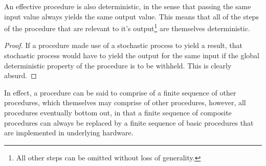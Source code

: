 An effective procedure is also deterministic, in the sense that passing the
same input value always yields the same output value. This means that all of
the steps of the procedure that are relevant to it's output\footnote{All other
steps can be omitted without loss of generality.} are themselves deterministic.

\begin{proof} If a procedure made use of a stochastic process to yield a
result, that stochastic process would have to yield the output for the same
input if the global deterministic property of the procedure is to be withheld.
This is clearly absurd.\end{proof}

In effect, a procedure can be said to comprise of a finite sequence of other
procedures, which themselves may comprise of other procedures, however, all
procedures eventually bottom out, in that a finite sequence of composite
procedures can always be replaced by a finite sequence of basic procedures that
are implemented in underlying hardware.






